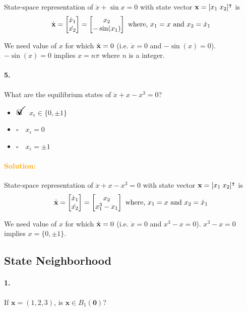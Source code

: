\documentclass[12pt, a4paper]{article}
\newcommand{\ans}{\item[]$\rlap{\LARGE{\checkmark}}\square\quad$}
\newcommand{\noans}{\item[]$\square\quad$}
\begin{document}
State-space representation of $\ddot{x} + \sin{x} = 0$ with state vector $\text{\bf{x}} = [x_{1}\;x_{2}]^{\intercal}$ is
$$\dot{\text{\bf{x}}} = \begin{bmatrix} \dot{x}_{1} \\ \dot{x_{2}}\end{bmatrix} = \begin{bmatrix} x_{2} \\ -\sin(x_{1})\end{bmatrix} \text{ where, } x_{1} = x \text{ and } x_{2} = \dot{x}_{1}$$

We need value of $x$ for which $\dot{\text{\bf{x}}} = 0$ (i.e. $\dot{x} = 0$ and $-\sin(x) = 0$).$-\sin(x) = 0$ implies $x = n\pi$ where $n$ is a integer.

\paragraph{5.}
What are the equilibrium states of $\ddot{x} + x - x^3 = 0$?

\begin{itemize}
\ans $x_{\epsilon} \in \{0,\pm 1\}$
\noans $x_{\epsilon} = 0$
\noans $x_{\epsilon} = \pm 1$
\end{itemize}

\paragraph{\textcolor{orange}{Solution:}}
State-space representation of $\ddot{x} + x - x^3 = 0$ with state vector $\text{\bf{x}} = [x_{1}\;x_{2}]^{\intercal}$ is
$$\dot{\text{\bf{x}}} = \begin{bmatrix} \dot{x}_{1} \\ \dot{x_{2}}\end{bmatrix} = \begin{bmatrix} x_{2} \\ x_{1}^{3}-x_{1} \end{bmatrix} \text{ where, } x_{1} = x \text{ and } x_{2} = \dot{x}_{1}$$

 
We need value of $x$ for which $\dot{\text{\bf{x}}} = 0$ (i.e. $\dot{x} = 0$ and $x^{3}-x = 0$). $x^{3}-x = 0$ implies $x = \{0,\pm1\}$.


\newpage
\subsection{State Neighborhood}
\paragraph{1.}
If $\bm{x} = (1,2,3)$, is $\bm{x} \in B_{1}(\bm{0})$?
\end{document}
